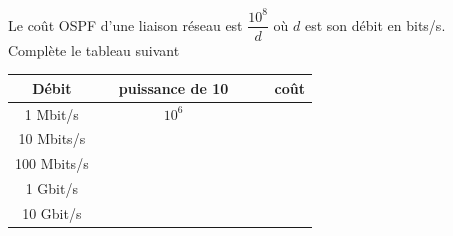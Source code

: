 \documentclass[a4paper,12pt,french]{article}
\begin{document}

\begin{exercice}

Le coût OSPF d'une liaison réseau est $\dfrac{10^8}{d}$ où $d$ est son débit en bits/s.\\
Complète le tableau suivant 
\begin{center}
\begin{tabular}{|c|c|c|}
	\hline
	\rowcolor{orange}		\ \ \textbf{\color{white}Débit}\ \  & \ \ \textbf{\color{white}puissance de 10}\ \ &\ \  \textbf{\color{white}coût}\\
	\hline
	\rowcolor{white} 1 Mbit/s& $10^6$ & \\
	\hline
	\rowcolor{white}10 Mbits/s& & \\
	\hline
	\rowcolor{white}100 Mbits/s& & \\
	\hline
	\rowcolor{white}1 Gbit/s& & \\
	\hline
	\rowcolor{white}10 Gbit/s& & \\
	\hline
	\end{tabular}

\end{center}

\end{exercice}
\end{document}
